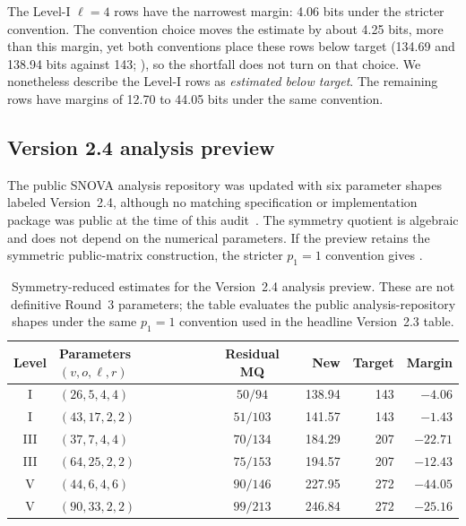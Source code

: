 \documentclass[11pt]{article}
\newcommand{\SNOVA}{\textsf{SNOVA}}
\begin{document}
The Level-I $\ell=4$ rows have the narrowest margin: 4.06 bits under the stricter convention.  The convention choice moves the estimate by about 4.25 bits, more than this margin, yet both conventions place these rows below target (134.69 and 138.94 bits against 143; ), so the shortfall does not turn on that choice.  We nonetheless describe the Level-I rows as \emph{estimated below target}.  The remaining rows have margins of 12.70 to 44.05 bits under the same convention.

\subsection{Version 2.4 analysis preview}\label{sec:snova24}

The public \SNOVA{} analysis repository was updated with six parameter shapes labeled Version~2.4, although no matching specification or implementation package was public at the time of this audit~\cite{SNOVA24Preview}.  The symmetry quotient is algebraic and does not depend on the numerical parameters.  If the preview retains the symmetric public-matrix construction, the stricter $p_1=1$ convention gives .

\begin{table}[t]
\centering
\caption{Symmetry-reduced estimates for the Version~2.4 analysis preview.  These are not definitive Round~3 parameters; the table evaluates the public analysis-repository shapes under the same $p_1=1$ convention used in the headline Version~2.3 table.}\label{tab:snova24}
\small
\setlength{\tabcolsep}{5pt}
\begin{tabular}{@{}c l c r r r@{}}
\toprule
Level & Parameters $(v,o,\ell,r)$ & Residual MQ & New & Target & Margin\\
\midrule
I   & $(26,5,4,4)$   & $50/94$  & 138.94 & 143 & $-4.06$\\
I   & $(43,17,2,2)$  & $51/103$ & 141.57 & 143 & $-1.43$\\
III & $(37,7,4,4)$   & $70/134$ & 184.29 & 207 & $-22.71$\\
III & $(64,25,2,2)$  & $75/153$ & 194.57 & 207 & $-12.43$\\
V   & $(44,6,4,6)$   & $90/146$ & 227.95 & 272 & $-44.05$\\
V   & $(90,33,2,2)$  & $99/213$ & 246.84 & 272 & $-25.16$\\
\bottomrule
\end{tabular}
\end{table}
\end{document}
